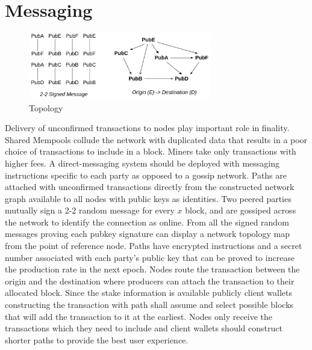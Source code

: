 \documentclass[a4paper,10pt]{article}
\begin{document}
\section{Messaging}
\begin{figure}[H]
\begin{center}
\includegraphics[width=8cm]{topology}
\caption{Topology}
\end{center}
\end{figure}
Delivery of unconfirmed transactions to nodes play important role in finality. Shared Mempools collude the network with duplicated data that results in a poor choice of transactions to include in a block. Miners take only transactions with higher fees. A direct-messaging system should be deployed with messaging instructions specific to each party as opposed to a gossip network. Paths are attached with unconfirmed transactions directly from the constructed network graph available to all nodes with public keys as identities. Two peered parties mutually sign a 2-2 random message for every $x$ block, and are gossiped across the network to identify the connection as online. From all the signed random messages proving each pubkey signature can display a network topology map from the point of reference node. 
Paths have encrypted instructions and a secret number associated with each party's public key that can be proved to increase the production rate in the next epoch. Nodes route the transaction between the origin and the destination where producers can attach the transaction to their allocated block. 
Since the stake information is available publicly client wallets constructing the transaction with path shall assume and select possible blocks that will add the transaction to it at the earliest. Nodes only receive the transactions which they need to include and client wallets should construct shorter paths to provide the best user experience.
\end{document}
